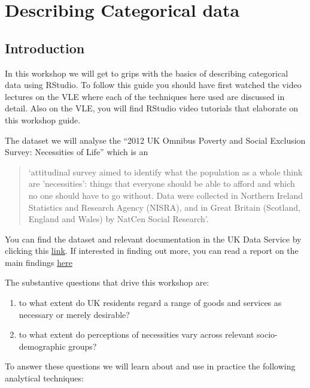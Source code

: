 \documentclass[
  letterpaper,
  DIV=11,
  numbers=noendperiod]{scrreprt}
\providecommand{\tightlist}{%
  \setlength{\itemsep}{0pt}\setlength{\parskip}{0pt}}
\begin{document}

\chapter{Describing Categorical data}\label{describing-categorical-data}

\section{Introduction}\label{introduction}

In this workshop we will get to grips with the basics of describing
categorical data using RStudio. To follow this guide you should have
first watched the video lectures on the VLE where each of the techniques
here used are discussed in detail. Also on the VLE, you will find
RStudio video tutorials that elaborate on this workshop guide.

The dataset we will analyse the ``2012 UK Omnibus Poverty and Social
Exclusion Survey: Necessities of Life'' which is an

\begin{quote}
`attitudinal survey aimed to identify what the population as a whole
think are 'necessities': things that everyone should be able to afford
and which no one should have to go without. Data were collected in
Northern Ireland Statistics and Research Agency (NISRA), and in Great
Britain (Scotland, England and Wales) by NatCen Social Research'.
\end{quote}

You can find the dataset and relevant documentation in the UK Data
Service by clicking this
\href{https://beta.ukdataservice.ac.uk/datacatalogue/studies/study?id=7878}{link}.
If interested in finding out more, you can read a report on the main
findings
\href{https://www.poverty.ac.uk/pse-research/what-do-we-think-we-need}{here}

The substantive questions that drive this workshop are:

\begin{enumerate}
\def\labelenumi{\arabic{enumi}.}
\tightlist
\item
  to what extent do UK residents regard a range of goods and services as
  necessary or merely desirable?
\item
  to what extent do perceptions of necessities vary across relevant
  socio-demographic groups?
\end{enumerate}

To answer these questions we will learn about and use in practice the
following analytical techniques:
\end{document}
